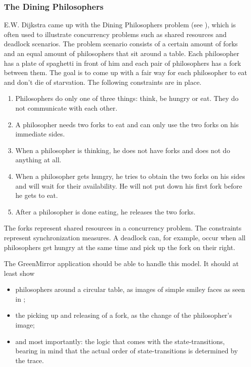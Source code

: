 \documentclass[a4paper]{article}
\begin{document}
\subsubsection{The Dining Philosophers}
E.W. Dijkstra came up with the Dining Philosophers problem (see \cite{dijkstra1968}), which is often used to illustrate concurrency problems such as shared resources and deadlock scenarios. The problem scenario consists of a certain amount of forks and an equal amount of philosophers that sit around a table. Each philosopher has a plate of spaghetti in front of him and each pair of philosophers has a fork between them. The goal is to come up with a fair way for each philosopher to eat and don't die of starvation. The following constraints are in place.
\begin{enumerate}
\item Philosophers do only one of three things: think, be hungry or eat. They do not communicate with each other.
\item A philosopher needs two forks to eat and can only use the two forks on his immediate sides.
\item When a philosopher is thinking, he does not have forks and does not do anything at all.
\item When a philosopher gets hungry, he tries to obtain the two forks on his sides and will wait for their availability. He will not put down his first fork before he gets to eat.
\item After a philosopher is done eating, he releases the two forks.
\end{enumerate}
The forks represent shared resources in a concurrency problem. The constraints represent synchronization measures. A deadlock can, for example, occur when all philosophers get hungry at the same time and pick up the fork on their right.

The GreenMirror application should be able to handle this model. It should at least show
\begin{itemize}
\item philosophers around a circular table, as images of simple smiley faces as seen in \cite{magee1999};
\item the picking up and releasing of a fork, as the change of the philosopher's image;
\item and most importantly: the logic that comes with the state-transitions, bearing in mind that the actual order of state-transitions is determined by the trace.
\end{itemize}
\end{document}
